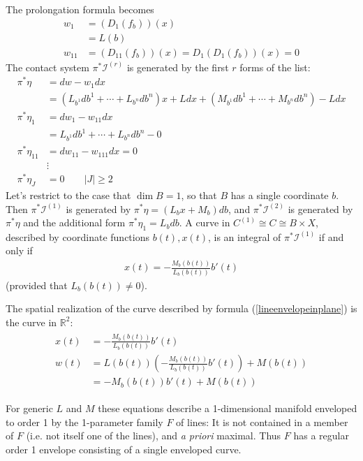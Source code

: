 \documentclass[12pt]{article}
\numberwithin{equation}{section}
\theoremstyle{plain}
\theoremstyle{definition}
\begin{document}
The prolongation formula becomes
\begin{align*}
w_{1}&=(D_1(f_b))(x)\\
&=L(b)\\
w_{11}&=(D_{11}(f_b))(x)=D_{1}(D_{1}(f_b))(x)=0
\end{align*}
The contact system $\pi^{*}\mathcal{I}^{(r)}$ is generated by the first $r$ forms of the list:
\begin{align*}
\pi^{*}\eta&=dw-w_{1}dx\\
&=(L_{b^{1}}db^{1}+\cdots+L_{b^{n}}db^{n})x+Ldx+(M_{b^{1}}db^{1}+\cdots+M_{b^{n}}db^{n})-Ldx\\
\pi^{*}\eta_{1}&=dw_{1}-w_{11}dx\\
&=L_{b^{1}}db^{1}+\cdots+L_{b^{n}}db^{n}-0\\
\pi^{*}\eta_{11}&=dw_{11}-w_{111}dx=0\\
&\vdots\\
\pi^{*}\eta_{J}&=0\qquad |J|\geq 2
\end{align*}
Let's restrict to the case that $\dim B=1$, so that $B$ has a single coordinate $b$. Then $\pi^{*}\mathcal{I}^{(1)}$ is generated by $\pi^{*}\eta=(L_{b}x+M_{b})db$, and $\pi^{*}\mathcal{I}^{(2)}$ is generated by $\pi^{*}\eta$ and the additional form $\pi^{*}\eta_{1}=L_{b}db$. A curve in $C^{(1)}\cong C\cong B\times X$, described by coordinate functions $b(t),x(t)$, is an integral of $\pi^{*}\mathcal{I}^{(1)}$ if and only if
\begin{align}\label{lineenvelopeinplane}
x(t)=-\frac{M_{b}(b(t))}{L_{b}(b(t))}b'(t)
\end{align}
(provided that $L_{b}(b(t))\neq 0$).

The spatial realization of the curve described by formula (\ref{lineenvelopeinplane}) is the curve in $\mathbb{R}^{2}$:
\begin{align}\label{simpleplanenv}
\begin{split}
x(t)&=-\frac{M_{b}(b(t))}{L_{b}(b(t))}b'(t)\\
w(t)&=L(b(t))(-\frac{M_{b}(b(t))}{L_{b}(b(t))}b'(t))+M(b(t))\\
&=-M_{b}(b(t))b'(t)+M(b(t))
\end{split}
\end{align}

For generic $L$ and $M$ these equations describe a 1-dimensional manifold enveloped to order 1 by the 1-parameter family $F$ of lines: It is not contained in a member of $F$ (i.e. not itself one of the lines), and \emph{a priori} maximal. Thus $F$ has a regular order 1 envelope consisting of a single enveloped curve.
\end{document}
